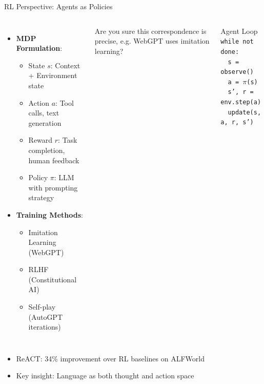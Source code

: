 \documentclass[aspectratio=169]{beamer}
\begin{document}
\begin{frame}{RL Perspective: Agents as Policies}
	\begin{columns}
		\begin{itemize}
			\item {\color{highlight}\textbf{MDP Formulation}}:
			\begin{itemize}
				\item State $s$: Context + Environment state
				\item Action $a$: Tool calls, text generation
				\item Reward $r$: Task completion, human feedback
				\item Policy $\pi$: LLM with prompting strategy
			\end{itemize}
			\item {\color{highlight}\textbf{Training Methods}}:
			\begin{itemize}
				\item Imitation Learning (WebGPT)
				\item RLHF (Constitutional AI)
				\item Self-play (AutoGPT iterations)
			\end{itemize}
		\end{itemize}
		Are you sure this correspondence is precise, e.g. WebGPT uses imitation learning?
		
		\begin{block}{Agent Loop}
			\footnotesize
			\texttt{while not done:}\\
			\texttt{\ \ s = observe()}\\
			\texttt{\ \ a = $\pi$(s)}\\
			\texttt{\ \ s', r = env.step(a)}\\
			\texttt{\ \ update(s, a, r, s')}
		\end{block}
	\end{columns}
	
	\vspace{0.3cm}
	\begin{itemize}
		\item ReACT: 34\% improvement over RL baselines on ALFWorld
		\item Key insight: Language as both thought and action space
	\end{itemize}
\end{frame}
\end{document}
